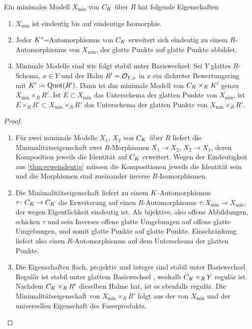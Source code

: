 \begin{Satz}\label{thm:eigminmodell}
  Ein minimales Modell $X_{\text{min}}$ von $C_{K}$ über $R$ hat
  folgende Eigenschaften
  \begin{enumerate}[label=(\roman*)]
  \item $X_{\text{min}}$ ist eindeutig bis auf eindeutige Isomorphie.
  \item{}
    Jeder $K$"=Automorphismus von $C_{K}$ erweitert sich eindeutig zu
    einem $R$-Automorphismus von $X_{\text{min}}$, der glatte Punkte
    auf glatte Punkte abbildet.
  \item{}
    Minimale Modelle sind wie folgt stabil unter Basiswechsel:
    Sei $Y$ glattes $R$-Schema, ${x\in Y}$ und der Halm $R'=\mathcal{O}_{Y,x}$ in
    $x$  ein diskreter Bewertungsring mit $K'\coloneqq\operatorname{Quot}(R')$.
    Dann ist das minimale Modell von $C_{K}\times_{K}K'$ genau
    $X_{\text{min}}\times_R R'$.
    Ist $E\subset X_{\text{min}}$ das Unterschema der glatten Punkte
    von $X_{\text{min}}$, ist
    $E\times_R R'\subset X_{\text{min}}\times_R R'$ das Unterschema
    der glatten Punkte von $X_{\text{min}}\times_R R'$.
  \end{enumerate}
  \begin{proof}
    \begin{enumerate}[label=(\roman*)]
    \item Für zwei minimale Modelle $X_1$, $X_2$ von $C_{K}$ über $R$
      liefert die Minimalitätseigenschaft zwei $R$-Morphismen
      $X_1\to X_2$, $X_2\to X_1$, deren Komposition jeweils die
      Identität auf $C_{K}$ erweitert. Wegen der Eindeutigkeit aus
      \ref{thm:erweindeutig} müssen die Kompositionen jeweils die
      Identität sein und die Morphismen sind zueinander inverse
      $R$-Isomorphismen.
    \item Die Minimalitätseigenschaft liefert zu einem
      $K$-Automorphismus $\tau\colon C_{K}\to C_{K}$ die Erweiterung auf
      einen $R$-Automorphismus
      $\tau\colon X_{\text{min}}\to X_{\text{min}}$, der wegen
      Eigentlichkeit eindeutig ist.
      Als bijektive, also offene Abbildungen, schicken $\tau$ und
      sein Inverses offene glatte Umgebungen auf offene glatte
      Umgebungen, und somit glatte Punkte auf glatte
      Punkte. Einschränkung liefert also einen $R$-Automorphismus auf
      dem Unterschema der glatten Punkte.
    \item Die Eigenschaften flach, projektiv und integer sind stabil
      unter Basiswechsel. Regulär ist stabil unter glattem
      Basiswechsel \cite[Chapter 2.3, Page 49]{neron}, weshalb
      $C_{K}\times_R Y$ regulär ist.
      Nachdem $C_{K}\times_R R'$ dieselben Halme hat, ist es ebenfalls
      regulär.
      Die Minimalitätseigenschaft von $X_{\text{min}}\times_R R'$
      folgt aus der von $X_{\text{min}}$ und der universellen
      Eigenschaft des Faserprodukts.
      

\end{enumerate}
\end{proof}
\end{Satz}
